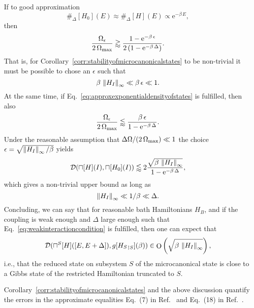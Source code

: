 \documentclass[a4paper,12pt,listof=totoc,index=totoc,bibliography=totoc,headsepline=false,headings=normal,BCOR16.153846mm,DIV12,headinclude,twoside,cleardoublepage=empty,numbers=noenddot,final]{scrreprt}
\theoremstyle{mystyle}
\numberwithin{equation}{section}
\numberwithin{figure}{section}
\numberwithin{lemma}{section}
\numberwithin{theorem}{section}
\numberwithin{corollary}{section}
\numberwithin{definition}{section}
\numberwithin{conjecture}{section}
\numberwithin{observation}{section}
\newcommand{\+}{\mkern2mu}
\newcommand{\texteqref}[1]{Eq.~\eqref{#1}}
\renewcommand{\max}{\mathchoice{\operatorname*{max}}{\operatorname*{max}}{\mathrm{max}}{\mathrm{max}}} %
\renewcommand{\H}{H}
\newcommand{\rhog}{g}
\newcommand{\rhomc}{{\sqcap}}
\newcommand{\norm}[2][]{
  \ifthenelse{\equal{#1}{}}
    {\left\| {#2} \right\|}
    {\ifthenelse{\equal{#1}{uinv}}
      {\left\vert\kern-0.25ex\left\vert\kern-0.25ex\left\vert {#2} \right\vert\kern-0.25ex\right\vert\kern-0.25ex\right\vert}
      {\left\| {#2} \right\|_{#1}}
    }
}
\newcommand{\tracedistance}[3][]{
  \ifthenelse{\equal{#2}{}}
  {\ifthenelse{\equal{#3}{}}
    {\mathcal{D}_{#1}}{}
  }{
    \ifthenelse{\equal{#1}{}}
    {\operatorname{\mathcal{D}}(#2,#3)}
    {\operatorname{\mathcal{D}}_{#1}(#2,#3)}
  }
}
\DeclareMathOperator{\landauO}{O}
\newcommand{\trunc}[2]{{#1}_{\upharpoonright \mathnormal{#2}}}
\newcommand{\e}{\mathrm{e}}
\DeclareMathOperator{\1}{\mathds{1}}
\begin{document}
If to good approximation 
\begin{equation} \label{eq:approxexponentialdensityofstates}
  \#_\Delta[\H_0](E) \approx \#_\Delta[\H](E) \propto \e^{-\beta\,E} ,
\end{equation}
then \cite[Appendix H]{Riera2012}
\begin{equation}
  \frac{\Omega_\epsilon}{2\,\Omega_{\max}} \gtrapprox \frac{1-\e^{-\beta\,\epsilon}}{2\,(1-\e^{-\beta\,\Delta})} .
\end{equation}
That is, for Corollary~\ref{corr:stabilityofmicrocanonicalstates} to be non-trivial it must be possible to chose an $\epsilon$ such that
\begin{equation}
  \beta\,\norm[\infty]{\H_I} \ll \beta\,\epsilon \ll 1 .
\end{equation}
At the same time, if \texteqref{eq:approxexponentialdensityofstates} is fulfilled, then also \cite[Appendix H]{Riera2012}
\begin{equation}
  \frac{\Omega_\epsilon}{2\,\Omega_{\max}} \lessapprox \frac{\beta\,\epsilon}{1-\e^{-\beta\,\Delta}} .
\end{equation}
Under the reasonable assumption that $\Delta\Omega/(2\,\Omega_{\max}) \ll 1$ the choice $\epsilon = \sqrt{\norm[\infty]{\H_I}/\beta}$ yields
\begin{equation}
  \tracedistance{\rhomc[\H](I)}{\rhomc[\H_0](I)} \lessapprox 2 \frac{\sqrt{\beta\,\norm[\infty]{\H_I}}}{1-\e^{-\beta\,\Delta}} ,
\end{equation}
which gives a non-trivial upper bound as long as
\begin{equation} \label{eq:weakinteractioncondition}
  \norm[\infty]{\H_I} \ll 1/\beta \ll \Delta .
\end{equation}
Concluding, we can say that for reasonable bath Hamiltonians $\H_B$, and if the coupling is weak enough and $\Delta$ large enough such that \texteqref{eq:weakinteractioncondition} is fulfilled, then one can expect that
\begin{equation} \label{eq:expectedorderupperboundondeviationfromlocalthermal}
  \tracedistance{\rhomc^S[\H]([E,E+\Delta])}{\rhog[\trunc{\H_S}S](\beta)} \in \landauO\left(\sqrt{\beta\,\norm[\infty]{H_I}}\right) ,
\end{equation}
i.e., that the reduced state on subsystem $S$ of the microcanonical state is close to a Gibbs state of the restricted Hamiltonian truncated to $S$.

Corollary~\ref{corr:stabilityofmicrocanonicalstates} and the above discussion quantify the errors in the approximate equalities Eq.~(7) in Ref.~\cite{Popescu05} and Eq.~(18) in Ref.~\cite{Goldstein06}.
\end{document}

